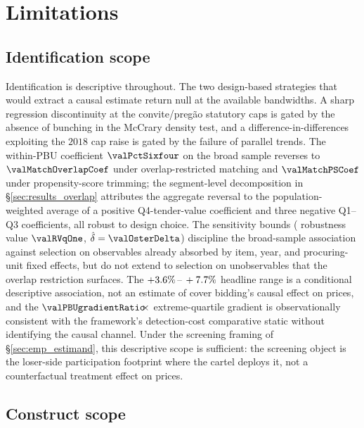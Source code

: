 \section{Limitations}
\label{sec:limitations}

\subsection{Identification scope}
\label{sec:lim_identification}

Identification is descriptive throughout. The two design-based
strategies that would extract a causal estimate return null at
the available bandwidths. A sharp regression discontinuity at
the convite/preg\~ao statutory caps is gated by the absence of
bunching in the McCrary density test, and a
difference-in-differences exploiting the $2018$ cap raise is
gated by the failure of parallel trends. The within-PBU coefficient
$\valPctSixfour$ on the broad sample reverses to
$\valMatchOverlapCoef$ under overlap-restricted matching and
$\valMatchPSCoef$ under propensity-score trimming; the
segment-level decomposition in \S\ref{sec:results_overlap}
attributes the aggregate reversal to the population-weighted
average of a positive Q4-tender-value coefficient and three
negative Q1--Q3 coefficients, all robust to design choice. The
sensitivity bounds (\citet{cinelli2020making} robustness value
$\valRVqOne$, \citet{oster2019unobservable}
$\hat\delta = \valOsterDelta$) discipline the broad-sample
association against selection on observables already absorbed by
item, year, and procuring-unit fixed effects, but do not extend
to selection on unobservables that the overlap restriction
surfaces. The $+3.6\%\,\text{--}\,+7.7\%$ headline range is a conditional
descriptive association, not an estimate of cover bidding's
causal effect on prices, and the
$\valPBUgradientRatio\!\!\times$ extreme-quartile gradient is
observationally consistent with the framework's detection-cost
comparative static without identifying the causal channel. Under
the screening framing of \S\ref{sec:emp_estimand}, this
descriptive scope is sufficient: the screening object is the
loser-side participation footprint where the cartel deploys it,
not a counterfactual treatment effect on prices.

\subsection{Construct scope}
\label{sec:lim_construct}

